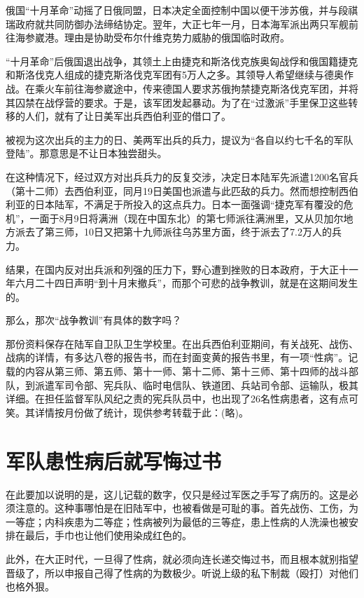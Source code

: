\documentclass[12pt,UTF8]{ctexbook}
\begin{document}
俄国“十月革命”动摇了日俄同盟，日本决定全面控制中国以便干涉苏俄，并与段祺瑞政府就共同防御办法缔结协定。翌年，大正七年一月，日本海军派出两只军舰前往海参崴港。理由是协助受布尔什维克势力威胁的俄国临时政府。

“十月革命”后俄国退出战争，其领土上由捷克和斯洛伐克族奥匈战俘和俄国籍捷克和斯洛伐克人组成的捷克斯洛伐克军团有5万人之多。其领导人希望继续与德奥作战。在乘火车前往海参崴途中，传来德国人要求苏俄拘禁捷克斯洛伐克军团，并将其囚禁在战俘营的要求。于是，该军团发起暴动。为了在“过激派”手里保卫这些转移的人们，就有了让日美军出兵西伯利亚的借口了。

被视为这次出兵的主力的日、美两军出兵的兵力，提议为“各自以约七千名的军队登陆”。那意思是不让日本独尝甜头。

在这种情况下，经过双方对出兵兵力的反复交涉，决定日本陆军先派遣1200名官兵（第十二师）去西伯利亚，同月19日美国也派遣与此匹敌的兵力。然而想控制西伯利亚的日本陆军，不满足于所投入的这点兵力。日本一面强调“捷克军有覆没的危机”，一面于8月9日将满洲（现在中国东北）的第七师派往满洲里，又从贝加尔地方派去了第三师，10日又把第十九师派往乌苏里方面，终于派去了7.2万人的兵力。

结果，在国内反对出兵派和列强的压力下，野心遭到挫败的日本政府，于大正十一年六月二十四日声明“到十月末撤兵”，而那个可悲的战争教训，就是在这期间发生的。

那么，那次“战争教训”有具体的数字吗？

那份资料保存在陆军自卫队卫生学校里。在出兵西伯利亚期间，有关战死、战伤、战病的详情，有多达八卷的报告书，而在封面变黄的报告书里，有一项“性病”。记载的内容从第三师、第五师、第十一师、第十二师、第十三师、第十四师的战斗部队，到派遣军司令部、宪兵队、临时电信队、铁道团、兵站司令部、运输队，极其详细。在担任监督军队风纪之责的宪兵队员中，也出现了26名性病患者，这有点可笑。其详情按月份做了统计，现供参考转载于此：(略)。

\section{军队患性病后就写悔过书}

在此要加以说明的是，这儿记载的数字，仅只是经过军医之手写了病历的。这是必须注意的。这种事哪怕是在旧陆军中，也被看做是可耻的事。首先战伤、工伤，为一等症；内科疾患为二等症；性病被列为最低的三等症，患上性病的人洗澡也被安排在最后，手巾也让他们使用染成红色的。

此外，在大正时代，一旦得了性病，就必须向连长递交悔过书，而且根本就别指望晋级了，所以申报自己得了性病的为数极少。听说上级的私下制裁（殴打）对他们也格外狠。
\end{document}
